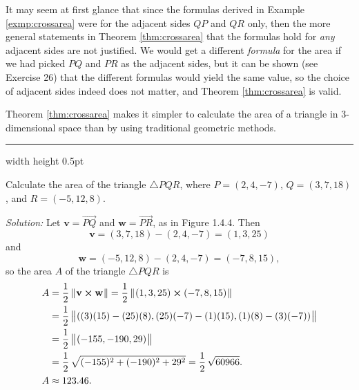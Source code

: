 It may seem at first glance that since the formulas derived in Example \ref{exmp:crossarea} were for the adjacent
sides $QP$ and $QR$ only, then the more general statements in Theorem \ref{thm:crossarea} that the formulas hold for
\emph{any} adjacent sides are not justified. We would get a different \emph{formula} for the area if we had
picked $PQ$ and $PR$ as the adjacent sides, but it can be shown (see Exercise 26) that the different formulas would
yield the same value, so the choice of adjacent sides indeed does not matter, and
Theorem \ref{thm:crossarea} is valid.

Theorem \ref{thm:crossarea} makes it simpler to calculate the area of a triangle in 3-dimensional space than by using
traditional geometric methods.

\medskip
\hrule width \textwidth height 0.5pt
\begin{exmp}
 Calculate the area of the triangle $\triangle PQR$, where $P = (2,4,-7)$, $Q = (3,7,18)$, and
 $R =(-5,12,8)$.\smallskip
 \piccaption[]{}
 \par\noindent\emph{Solution:} Let $\textbf{v} = \overrightarrow{PQ}$ and $\textbf{w} = \overrightarrow{PR}$, as in
 Figure 1.4.4. 
 Then 
 \[\textbf{v} = (3,7,18) - (2,4,-7) = (1,3,25)\] 
 and 
 \[\textbf{w} = (-5,12,8) - (2,4,-7) = (-7,8,15),\]
 so the area $A$ of the triangle $\triangle PQR$ is
 \begin{align*}
 A &= \frac{1}{2}\,\lVert\mspace{1mu}\textbf{v} \bm{\times} \textbf{w}\mspace{1mu}\rVert = \frac{1}{2}\,\lVert\mspace{1mu}(1,3,25) \bm{\times} (-7,8,15)\mspace{1mu}\rVert\\
 &= \frac{1}{2}\,\bigl\lVert\mspace{1mu}((3)(15) - (25)(8), (25)(-7) - (1)(15), (1)(8) - (3)(-7))\mspace{1mu}\bigr\rVert\\
 &= \frac{1}{2}\,\bigl\lVert\mspace{1mu}(-155, -190, 29)\mspace{1mu}\bigr\rVert\\
 &= \frac{1}{2}\,\sqrt{(-155)^2 + (-190)^2 + 29^2} = \frac{1}{2}\,\sqrt{60966}.\\
 A &\approx 123.46.
 \end{align*}
 \end{exmp}
